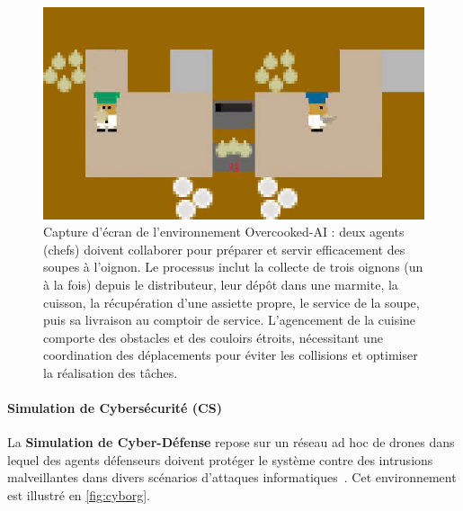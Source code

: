\begin{figure}[h!]
    \centering
    \includegraphics[width=0.6\linewidth]{figures/overcooked.png}
    \caption{Capture d'écran de l'environnement Overcooked-AI : deux agents (chefs) doivent collaborer pour préparer et servir efficacement des soupes à l'oignon. Le processus inclut la collecte de trois oignons (un à la fois) depuis le distributeur, leur dépôt dans une marmite, la cuisson, la récupération d'une assiette propre, le service de la soupe, puis sa livraison au comptoir de service. L'agencement de la cuisine comporte des obstacles et des couloirs étroits, nécessitant une coordination des déplacements pour éviter les collisions et optimiser la réalisation des tâches.}
    \label{fig:overcooked}
\end{figure}

\paragraph{Simulation de Cybersécurité (CS)}

La \textbf{Simulation de Cyber-Défense} repose sur un réseau ad hoc de drones dans lequel des agents défenseurs doivent protéger le système contre des intrusions malveillantes dans divers scénarios d'attaques informatiques~\cite{Maxwell2021}. Cet environnement est illustré en \autoref{fig:cyborg}.

